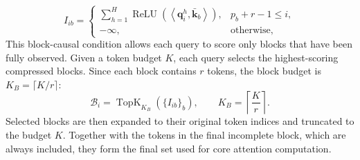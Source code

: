 \begin{equation}
    I_{ib}
    =
    \left\{
    \begin{array}{cl}
        \displaystyle
        \sum_{h=1}^{H}
        \operatorname{ReLU}\left(
        \left\langle\mathbf{q}_i^h,\bar{\mathbf{k}}_b\right\rangle
        \right),
        & p_b+r-1\le i,\\[6pt]
        -\infty,
        & \text{otherwise},
    \end{array}
    \right.
    \label{eq:qsa-index-score}
\end{equation}
This block-causal condition allows each query to score only blocks that have been fully observed.
Given a token budget $K$, each query selects the highest-scoring compressed blocks.
Since each block contains $r$ tokens, the block budget is
$K_B=\lceil K/r\rceil$:
\begin{equation}
    \mathcal{B}_i
    = \operatorname{TopK}_{K_B}\left(\{I_{ib}\}_b\right),
    \qquad
    K_B=\left\lceil\frac{K}{r}\right\rceil.
    \label{eq:qsa-topk-blocks}
\end{equation}
Selected blocks are then expanded to their original token indices and
truncated to the budget $K$.
Together with the tokens in the final incomplete
block, which are always included, they form the final set used for core attention computation.

